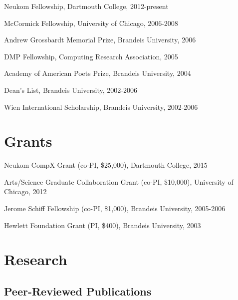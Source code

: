 \documentclass[10.5pt,letterpaper]{article}
\begin{document}
\begin{itemize*}
\item Neukom Fellowship, Dartmouth College, 2012-present
\item McCormick Fellowship,  University of Chicago, 2006-2008
\item Andrew Grossbardt Memorial Prize, Brandeis University, 2006
\item DMP Fellowship, Computing Research Association, 2005
\item Academy of American Poets Prize, Brandeis University, 2004
\item Dean's List, Brandeis University, 2002-2006
\item Wien International Scholarship, Brandeis University, 2002-2006
\end{itemize*}


\section*{Grants}
%

\begin{itemize*}
\item Neukom CompX Grant (co-PI, \$25,000), Dartmouth College, 2015
\item Arts/Science Graduate Collaboration Grant (co-PI, \$10,000),  University of Chicago, 2012
\item Jerome Schiff Fellowship (co-PI, \$1,000), Brandeis University, 2005-2006
\item Hewlett Foundation  Grant (PI, \$400), Brandeis University, 2003
\end{itemize*}


\section*{Research}

\subsection*{Peer-Reviewed Publications}
\end{document}

